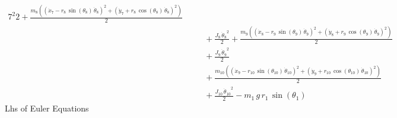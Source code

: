 \begin{eqnarray*}
{{{{7}}}^2}{2} + \frac{m_{8}\left(\left({\dot{x}_{7}}-r_{8}\,\sin({\theta
_{8}})\,{\dot{\theta}_{8}}\right)^2+\left({\dot{y}_{7}}+r_{8}\,\cos({
\theta_{8}})\,{\dot{\theta}_{8}}\right)^2\right)}{2} \\ &&\quad\mbox{}
 + \frac{J_{8}\,{{\dot{\theta}_{8}}}^2}{2} + \frac{m_{9}\left(\left({
\dot{x}_{8}}-r_{9}\,\sin({\theta_{9}})\,{\dot{\theta}_{9}}\right)^2+
\left({\dot{y}_{8}}+r_{9}\,\cos({\theta_{9}})\,{\dot{\theta}_{9}}
\right)^2\right)}{2} \\ &&\quad\mbox{} + \frac{J_{9}\,{{\dot{\theta}_{
9}}}^2}{2} \\ &&\quad\mbox{} + \frac{m_{10}\left(\left({\dot{x}_{9}}-r
_{10}\,\sin({\theta_{10}})\,{\dot{\theta}_{10}}\right)^2+\left({
\dot{y}_{9}}+r_{10}\,\cos({\theta_{10}})\,{\dot{\theta}_{10}}\right)^2
\right)}{2} \\ &&\quad\mbox{} + \frac{J_{10}\,{{\dot{\theta}_{10}}}^2
}{2} - m_{1}\,g\,r_{1}\,\sin({\theta_{1}}) \end{eqnarray*}
Lhs of Euler Equations
 
